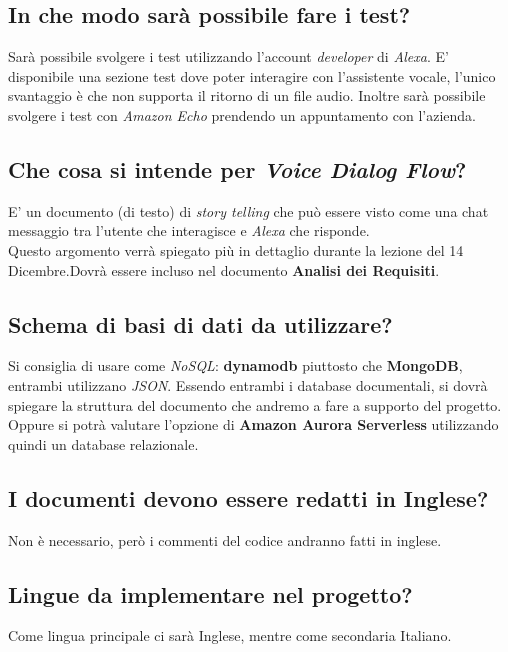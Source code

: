 \documentclass[a4paper,12pt]{article}
\begin{document}
	\subsection{In che modo sarà possibile fare i test?}
	Sarà possibile svolgere i test utilizzando l'account \textit{developer} di \textit{Alexa}. E' disponibile una sezione test dove poter interagire con l'assistente vocale, l'unico svantaggio è che non supporta il ritorno di un file audio. Inoltre sarà possibile svolgere i test con \textit{Amazon Echo} prendendo un appuntamento con l'azienda.

	\subsection{Che cosa si intende per \textit{Voice Dialog Flow}?}
	E' un documento (di testo) di \textit{story telling} che può essere visto come una chat messaggio tra l'utente che interagisce e \textit{Alexa} che risponde. \\
	Questo argomento verrà spiegato più in dettaglio durante la lezione del 14 Dicembre.Dovrà essere incluso nel documento \textbf{Analisi dei Requisiti}.
	
	\subsection{Schema di basi di dati da utilizzare?}
	Si consiglia di usare come \textit{NoSQL}: \textbf{dynamodb} piuttosto che \textbf{MongoDB}, entrambi utilizzano \textit{JSON}. Essendo entrambi i database documentali, si dovrà spiegare la struttura del documento che andremo a fare a supporto del progetto. Oppure si potrà valutare l'opzione di \textbf{Amazon Aurora Serverless} utilizzando quindi un database relazionale.
	
	\subsection{I documenti devono essere redatti in Inglese?}
	Non è necessario, però i commenti del codice andranno fatti in inglese.
	
	\subsection{Lingue da implementare nel progetto?}
	Come lingua principale ci sarà Inglese, mentre come secondaria Italiano.
	
\end{document}
